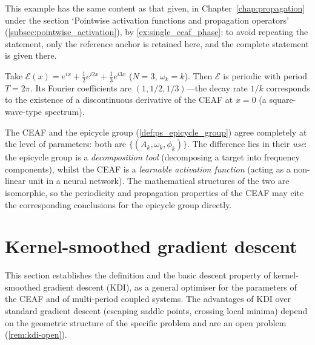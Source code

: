 \begin{example}\label{ex:single_ceaf_phase_ps}
This example has the same content as that given, in Chapter~\ref{chap:propagation} under the section `Pointwise activation functions and propagation operators' (\cref{subsec:pointwise_activation}), by \cref{ex:single_ceaf_phase}; to avoid repeating the statement, only the reference anchor is retained here, and the complete statement is given there.
\end{example}

\begin{example}\label{ex:three_component_ceaf}
Take $\mathcal{E}(x) = e^{ix} + \frac{1}{2}e^{i2x} + \frac{1}{3}e^{i3x}$ ($N=3$, $\omega_k = k$). Then $\mathcal{E}$ is periodic with period $T = 2\pi$. Its Fourier coefficients are $(1,1/2,1/3)$---the decay rate $1/k$ corresponds to the existence of a discontinuous derivative of the CEAF at $x=0$ (a square-wave-type spectrum).
\end{example}

\begin{remark}\label{rem:ceaf_epicycle_group}
The CEAF and the epicycle group (\cref{def:ps_epicycle_group}) agree completely at the level of parameters: both are $\{(A_k,\omega_k,\phi_k)\}$. The difference lies in their \emph{use}: the epicycle group is a \emph{decomposition tool} (decomposing a target into frequency components), whilst the CEAF is a \emph{learnable activation function} (acting as a non-linear unit in a neural network). The mathematical structures of the two are isomorphic, so the periodicity and propagation properties of the CEAF may cite the corresponding conclusions for the epicycle group directly.
\end{remark}

\section{Kernel-smoothed gradient descent}\label{sec:ps_kdi}

\begin{remark}\label{rem:kdi-positioning}
This section establishes the definition and the basic descent property of kernel-smoothed gradient descent (KDI), as a general optimiser for the parameters of the CEAF and of multi-period coupled systems. The advantages of KDI over standard gradient descent (escaping saddle points, crossing local minima) depend on the geometric structure of the specific problem and are an open problem (\cref{rem:kdi-open}).
\end{remark}

